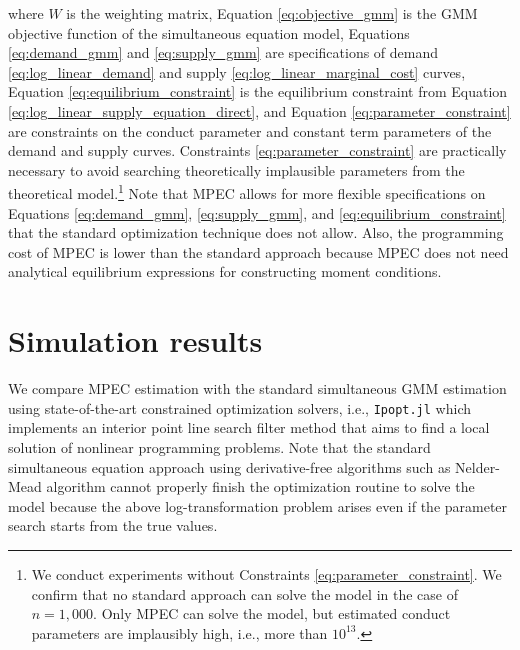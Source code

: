 \documentclass[11pt, a4paper]{article}
\begin{document}
where $W$ is the weighting matrix, Equation \eqref{eq:objective_gmm} is the GMM objective function of the simultaneous equation model, 
Equations \eqref{eq:demand_gmm} and \eqref{eq:supply_gmm} are specifications of demand \eqref{eq:log_linear_demand} and supply \eqref{eq:log_linear_marginal_cost} curves, 
Equation \eqref{eq:equilibrium_constraint} is the equilibrium constraint from Equation \eqref{eq:log_linear_supply_equation_direct}, and Equation \eqref{eq:parameter_constraint} are constraints on the conduct parameter and constant term parameters of the demand and supply curves. 
Constraints \eqref{eq:parameter_constraint} are practically necessary to avoid searching theoretically implausible parameters from the theoretical model.\footnote{We conduct experiments without Constraints \eqref{eq:parameter_constraint}. We confirm that no standard approach can solve the model in the case of $n=1,000$. Only MPEC can solve the model, but estimated conduct parameters are implausibly high, i.e., more than $10^{13}$.}
Note that MPEC allows for more flexible specifications on Equations \eqref{eq:demand_gmm}, \eqref{eq:supply_gmm}, and \eqref{eq:equilibrium_constraint} that the standard optimization technique does not allow. Also, the programming cost of MPEC is lower than the standard approach because MPEC does not need analytical equilibrium expressions for constructing moment conditions.





\section{Simulation results}\label{sec:results}

We compare MPEC estimation with the standard simultaneous GMM estimation using state-of-the-art constrained optimization solvers, i.e., \texttt{Ipopt.jl} which implements an interior point line search filter method that aims to find a local solution of nonlinear programming problems. Note that the standard simultaneous equation approach using derivative-free algorithms such as Nelder-Mead algorithm cannot properly finish the optimization routine to solve the model because the above log-transformation problem arises even if the parameter search starts from the true values.  
\end{document}
